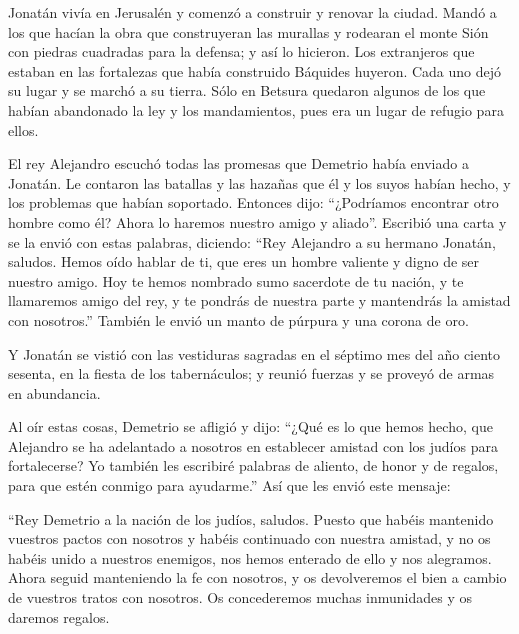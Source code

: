  Jonatán vivía en Jerusalén y comenzó a construir y
renovar la ciudad.  Mandó a los que hacían la obra que
construyeran las murallas y rodearan el monte Sión con piedras cuadradas
para la defensa; y así lo hicieron.  Los extranjeros que
estaban en las fortalezas que había construido Báquides huyeron.
 Cada uno dejó su lugar y se marchó a su tierra.
 Sólo en Betsura quedaron algunos de los que habían
abandonado la ley y los mandamientos, pues era un lugar de refugio para
ellos.

 El rey Alejandro escuchó todas las promesas que Demetrio
había enviado a Jonatán. Le contaron las batallas y las hazañas que él y
los suyos habían hecho, y los problemas que habían soportado.
 Entonces dijo: ``¿Podríamos encontrar otro hombre como
él? Ahora lo haremos nuestro amigo y aliado''.  Escribió
una carta y se la envió con estas palabras, diciendo: 
``Rey Alejandro a su hermano Jonatán, saludos.  Hemos
oído hablar de ti, que eres un hombre valiente y digno de ser nuestro
amigo.  Hoy te hemos nombrado sumo sacerdote de tu
nación, y te llamaremos amigo del rey, y te pondrás de nuestra parte y
mantendrás la amistad con nosotros.'' También le envió un manto de
púrpura y una corona de oro.

 Y Jonatán se vistió con las vestiduras sagradas en el
séptimo mes del año ciento sesenta, en la fiesta de los tabernáculos; y
reunió fuerzas y se proveyó de armas en abundancia.

 Al oír estas cosas, Demetrio se afligió y dijo:
 ``¿Qué es lo que hemos hecho, que Alejandro se ha
adelantado a nosotros en establecer amistad con los judíos para
fortalecerse?  Yo también les escribiré palabras de
aliento, de honor y de regalos, para que estén conmigo para ayudarme.''
 Así que les envió este mensaje:

``Rey Demetrio a la nación de los judíos, saludos. 
Puesto que habéis mantenido vuestros pactos con nosotros y habéis
continuado con nuestra amistad, y no os habéis unido a nuestros
enemigos, nos hemos enterado de ello y nos alegramos. 
Ahora seguid manteniendo la fe con nosotros, y os devolveremos el bien a
cambio de vuestros tratos con nosotros.  Os concederemos
muchas inmunidades y os daremos regalos.

